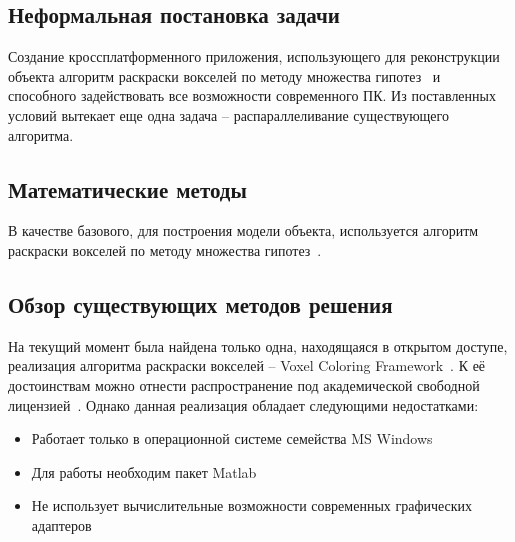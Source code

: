 \subsection{Неформальная постановка задачи}
Создание кроссплатформенного приложения, использующего для реконструкции объекта алгоритм раскраски вокселей по методу множества гипотез~\cite{multi_hypothesis} и способного задействовать все возможности современного ПК. Из поставленных условий вытекает еще одна задача -- распараллеливание существующего алгоритма.

\subsection{Математические методы}
В качестве базового, для построения модели объекта, используется алгоритм раскраски вокселей по методу множества гипотез~\cite{multi_hypothesis}.

\subsection{Обзор существующих методов решения}

На текущий момент была найдена только одна, находящаяся в открытом доступе, реализация алгоритма раскраски вокселей -- Voxel Coloring Framework~\cite{voxel_coloring_framework}. К её достоинствам можно отнести распространение под академической свободной лицензией~\cite{academic_free_license}. Однако данная реализация обладает следующими недостатками:
\begin{itemize}
\item Работает только в операционной системе семейства MS Windows
\item Для работы необходим пакет Matlab
\item Не использует вычислительные возможности современных графических адаптеров
\end{itemize}
